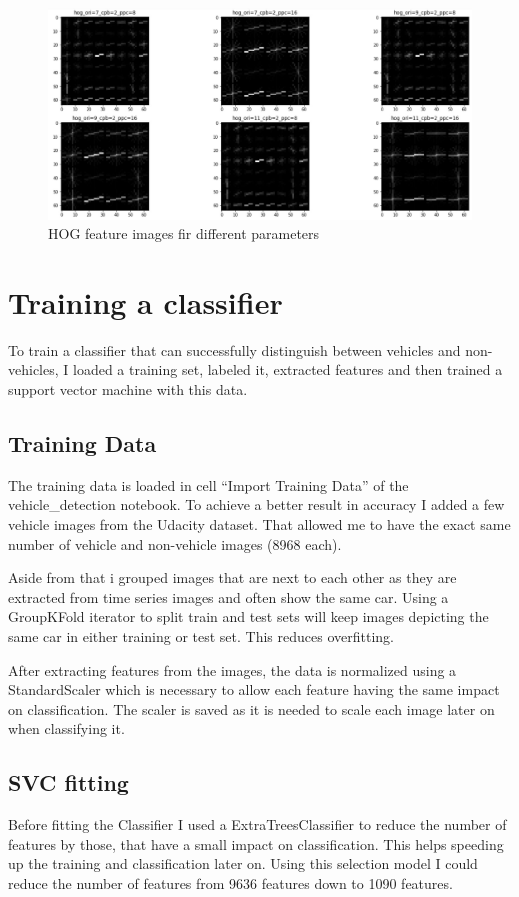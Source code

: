\documentclass[a4paper, 11pt, DIV=14]{scrartcl}
\begin{document}
\begin{figure}[h]
    \centering
    \includegraphics[width=\textwidth]{output_images/feature_hog.jpg}
        \caption{HOG feature images fir different parameters}
    \label{fig:feature_hog}
\end{figure}


\section{Training a classifier}
To train a classifier that can successfully distinguish between vehicles and non-vehicles, I loaded a training set, labeled it, extracted features and then trained a support vector machine with this data.

\subsection{Training Data}
The training data is loaded in cell ``Import Training Data'' of the vehicle\_detection notebook. To achieve a better result in accuracy I added a few vehicle images from the Udacity dataset. That allowed me to have the exact same number of vehicle and non-vehicle images (8968 each).

Aside from that i grouped images that are next to each other as they are extracted from time series images and often show the same car. Using a GroupKFold iterator to split train and test sets will keep images depicting the same car in either training or test set. This reduces overfitting.

After extracting features from the images, the data is normalized using a StandardScaler which is necessary to allow each feature having the same impact on classification. The scaler is saved as it is needed to scale each image later on when classifying it.

\subsection{SVC fitting}
Before fitting the Classifier I used a ExtraTreesClassifier to reduce the number of features by those, that have a small impact on classification. This helps speeding up the training and classification later on. Using this selection model I could reduce the number of features from 9636 features down to 1090 features.
\end{document}
